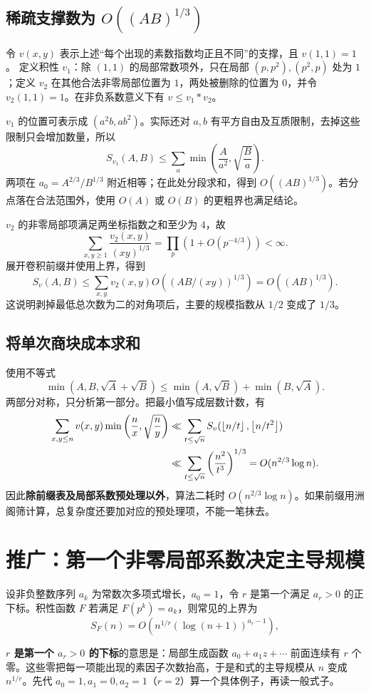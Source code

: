 \subsection{稀疏支撑数为 \texorpdfstring{$O((AB)^{1/3})$}{O((AB)1/3)}}
令 $v(x,y)$ 表示上述“每个出现的素数指数均正且不同”的支撑，且 $v(1,1)=1$。
定义积性 $v_1$：除 $(1,1)$ 的局部常数项外，只在局部 $(p,p^2),(p^2,p)$ 处为 $1$；定义 $v_2$ 在其他合法非零局部位置为 $1$，两处被删除的位置为 $0$，并令 $v_2(1,1)=1$。在非负系数意义下有 $v\le v_1*v_2$。

$v_1$ 的位置可表示成 $(a^2b,ab^2)$。实际还对 $a,b$ 有平方自由及互质限制，去掉这些限制只会增加数量，所以
\[
 S_{v_1}(A,B)\le\sum_a\min\left(\frac A{a^2},\sqrt{\frac Ba}\right).
\]
两项在 $a_0=A^{2/3}/B^{1/3}$ 附近相等；在此处分段求和，得到 $O((AB)^{1/3})$。若分点落在合法范围外，使用 $O(A)$ 或 $O(B)$ 的更粗界也满足结论。

$v_2$ 的非零局部项满足两坐标指数之和至少为 $4$，故
\[
 \sum_{x,y\ge1}\frac{v_2(x,y)}{(xy)^{1/3}}
 =\prod_p\left(1+O(p^{-4/3})\right)<\infty.
\]
展开卷积前缀并使用上界，得到
\[
 S_v(A,B)\le\sum_{x,y}v_2(x,y)
 O\!\left((AB/(xy))^{1/3}\right)=O((AB)^{1/3}).
\]
这说明剥掉最低总次数为二的对角项后，主要的规模指数从 $1/2$ 变成了 $1/3$。

\subsection{将单次商块成本求和}
使用不等式
\[
 \min(A,B,\sqrt A+\sqrt B)
 \le\min(A,\sqrt B)+\min(B,\sqrt A).
\]
两部分对称，只分析第一部分。把最小值写成层数计数，有
\[
\begin{aligned}
 \sum_{x,y\le n}v(x,y)\min\left(\frac nx,\sqrt{\frac ny}\right)
 &\ll\sum_{t\le\sqrt n}S_v(\left\lfloor n/t\right\rfloor,\left\lfloor n/t^2\right\rfloor)\\
 &\ll\sum_{t\le\sqrt n}\left(\frac{n^2}{t^3}\right)^{1/3}
 =O(n^{2/3}\log n).
\end{aligned}
\]
因此\textbf{除前缀表及局部系数预处理以外}，算法二耗时 $O(n^{2/3}\log n)$。如果前缀用洲阁筛计算，总复杂度还要加对应的预处理项，不能一笔抹去。


\section{推广：第一个非零局部系数决定主导规模}
设非负整数序列 $a_k$ 为常数次多项式增长，$a_0=1$，令 $r$ 是第一个满足 $a_r>0$ 的正下标。积性函数 $F$ 若满足 $F(p^k)=a_k$，则常见的上界为
\[
 S_F(n)=O\left(n^{1/r}(\log(n+1))^{a_r-1}\right),
\]

\begin{tip}
\textbf{$r$ 是第一个 $a_r>0$ 的下标}的意思是：局部生成函数 $a_0+a_1z+\cdots$ 前面连续有 $r$ 个零。这些零把每一项能出现的素因子次数抬高，于是和式的主导规模从 $n$ 变成 $n^{1/r}$。先代 $a_0=1,a_1=0,a_2=1$（$r=2$）算一个具体例子，再读一般式子。
\end{tip}

